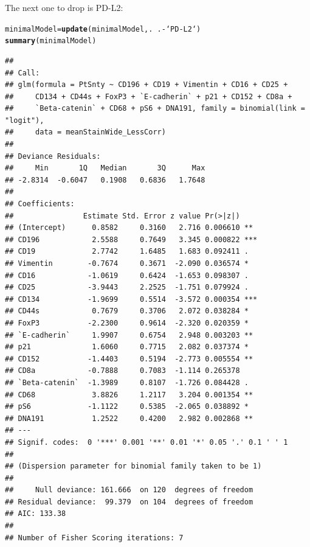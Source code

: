 \documentclass[a4paper]{article}\usepackage[]{graphicx}\usepackage[]{color}
\makeatletter
\newcommand{\hlopt}[1]{\textcolor[rgb]{0,0,0}{#1}}%
\newcommand{\hlstd}[1]{\textcolor[rgb]{0.345,0.345,0.345}{#1}}%
\newcommand{\hlkwb}[1]{\textcolor[rgb]{0.69,0.353,0.396}{#1}}%
\newcommand{\hlkwd}[1]{\textcolor[rgb]{0.737,0.353,0.396}{\textbf{#1}}}%
\newenvironment{kframe}{%
 \def\at@end@of@kframe{}%
 \ifinner\ifhmode%
  \def\at@end@of@kframe{\end{minipage}}%
  \begin{minipage}{\columnwidth}%
 \fi\fi%
 \def\FrameCommand##1{\hskip\@totalleftmargin \hskip-\fboxsep
 \colorbox{shadecolor}{##1}\hskip-\fboxsep
     \hskip-\linewidth \hskip-\@totalleftmargin \hskip\columnwidth}%
 \MakeFramed {\advance\hsize-\width
   \@totalleftmargin\z@ \linewidth\hsize
   \@setminipage}}%
 {\par\unskip\endMakeFramed%
 \at@end@of@kframe}
\newenvironment{knitrout}{}{} %
\makeatother
\begin{document}
The next one to drop is PD-L2:
\begin{knitrout}
\color{fgcolor}\begin{kframe}
\begin{alltt}
\hlstd{minimalModel} \hlkwb{=} \hlkwd{update}\hlstd{(minimalModel,.}\hlopt{~}\hlstd{.}\hlopt{-}\hlstd{`PD-L2`)}
\hlkwd{summary}\hlstd{(minimalModel)}
\end{alltt}
\begin{verbatim}
## 
## Call:
## glm(formula = PtSnty ~ CD196 + CD19 + Vimentin + CD16 + CD25 + 
##     CD134 + CD44s + FoxP3 + `E-cadherin` + p21 + CD152 + CD8a + 
##     `Beta-catenin` + CD68 + pS6 + DNA191, family = binomial(link = "logit"), 
##     data = meanStainWide_LessCorr)
## 
## Deviance Residuals: 
##     Min       1Q   Median       3Q      Max  
## -2.8314  -0.6047   0.1908   0.6836   1.7648  
## 
## Coefficients:
##                Estimate Std. Error z value Pr(>|z|)    
## (Intercept)      0.8582     0.3160   2.716 0.006610 ** 
## CD196            2.5588     0.7649   3.345 0.000822 ***
## CD19             2.7742     1.6485   1.683 0.092411 .  
## Vimentin        -0.7674     0.3671  -2.090 0.036574 *  
## CD16            -1.0619     0.6424  -1.653 0.098307 .  
## CD25            -3.9443     2.2525  -1.751 0.079924 .  
## CD134           -1.9699     0.5514  -3.572 0.000354 ***
## CD44s            0.7679     0.3706   2.072 0.038284 *  
## FoxP3           -2.2300     0.9614  -2.320 0.020359 *  
## `E-cadherin`     1.9907     0.6754   2.948 0.003203 ** 
## p21              1.6060     0.7715   2.082 0.037374 *  
## CD152           -1.4403     0.5194  -2.773 0.005554 ** 
## CD8a            -0.7888     0.7083  -1.114 0.265378    
## `Beta-catenin`  -1.3989     0.8107  -1.726 0.084428 .  
## CD68             3.8826     1.2117   3.204 0.001354 ** 
## pS6             -1.1122     0.5385  -2.065 0.038892 *  
## DNA191           1.2522     0.4200   2.982 0.002868 ** 
## ---
## Signif. codes:  0 '***' 0.001 '**' 0.01 '*' 0.05 '.' 0.1 ' ' 1
## 
## (Dispersion parameter for binomial family taken to be 1)
## 
##     Null deviance: 161.666  on 120  degrees of freedom
## Residual deviance:  99.379  on 104  degrees of freedom
## AIC: 133.38
## 
## Number of Fisher Scoring iterations: 7
\end{verbatim}
\end{kframe}
\end{knitrout}
\end{document}
